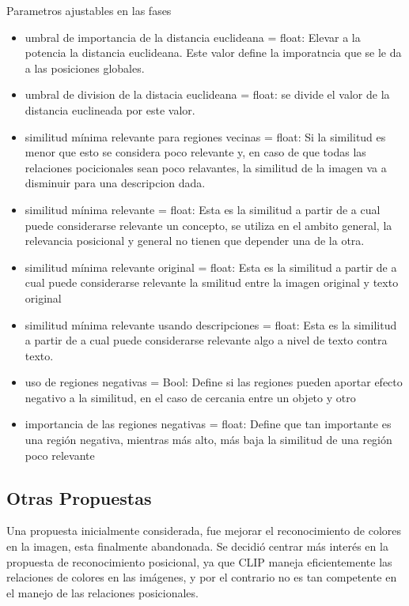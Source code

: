  Parametros ajustables en las fases
\begin{itemize}
    \item umbral de importancia de la distancia euclideana = float: Elevar a la potencia la distancia euclideana. Este valor define la imporatncia que se le da a las posiciones globales.
    \item umbral de division de la distacia euclideana = float: se divide el valor de la distancia euclineada por este valor.
    \item similitud m\'inima relevante para regiones vecinas = float: Si la similitud es menor que esto se considera poco relevante y, en caso de que todas las relaciones pocicionales sean poco relavantes, la similitud de la imagen va a disminuir para una descripcion dada.
    \item similitud m\'inima relevante = float: Esta es la similitud a partir de a cual puede considerarse relevante un concepto, se utiliza en el ambito general, la relevancia posicional y general no tienen que depender una de la otra.
    \item similitud m\'inima relevante original = float: Esta es la similitud a partir de a cual puede considerarse relevante la smilitud entre la imagen original y texto original
    \item similitud m\'inima relevante usando descripciones = float: Esta es la similitud a partir de a cual puede considerarse relevante algo a nivel de texto contra texto. 
    \item uso de regiones negativas = Bool: Define si las regiones pueden aportar efecto negativo a la similitud, en el caso de cercania entre un objeto y otro
    \item importancia de las regiones negativas = float: Define que tan importante es una regi\'on negativa, mientras m\'as alto, m\'as baja la similitud de una regi\'on poco relevante
\end{itemize}

\subsection*{Otras Propuestas}

Una propuesta inicialmente considerada, fue mejorar el reconocimiento de colores en la imagen, esta finalmente abandonada. Se decidió centrar más interés en la propuesta de reconocimiento posicional, ya que CLIP maneja eficientemente las relaciones de colores en las imágenes, y por el contrario no es tan competente en el manejo de las relaciones posicionales.

